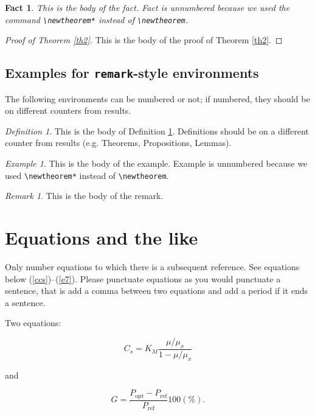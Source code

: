\documentclass[qe,nameyear,draft]{econsocart}
\theoremstyle{plain}
\newtheorem*{fact}{Fact}
\theoremstyle{remark}
\newtheorem{definition}{Definition}
\newtheorem*{example}{Example}
\newtheorem{remark}{Remark}
\begin{document}
\begin{fact}
This is the body of the fact. Fact is unnumbered because we used the command \verb|\newtheorem*|
instead of \verb|\newtheorem|.
\end{fact}

\begin{proof}[Proof of Theorem \ref{th2}]
This is the body of the proof of Theorem \ref{th2}.
\end{proof}
\subsection{Examples for \texttt{remark}-style environments}

The following environments can be numbered or not; if numbered, they should be on different counters from results.


\begin{definition}\label{de1}
This is the body of Definition \ref{de1}. Definitions should be on a different counter from results (e.g. Theorems, Propositions, Lemmas).
\end{definition}

\begin{example}
This is the body of the example. Example is unnumbered because we used \verb|\newtheorem*|
instead of \verb|\newtheorem|.
\end{example}

\begin{remark}
This is the body of the remark. 
\end{remark}
\section{Equations and the like}

Only number equations to which there is a subsequent reference.
See equations below (\ref{ccs})--(\ref{e7}). Please punctuate equations as you would punctuate a sentence, that is add a comma between two equations and add a period if it ends a sentence.

Two equations:

\begin{equation}
\label{ccs}
C_{s}  =  K_{M} \frac{\mu/\mu_{x}}{1-\mu/\mu_{x}}
\end{equation}

and

\begin{equation}
G = \frac{P_{\mathrm{opt}} - P_{\mathrm{ref}}}{P_{\mathrm{ref}}}  100(\%).
\end{equation}
\end{document}
